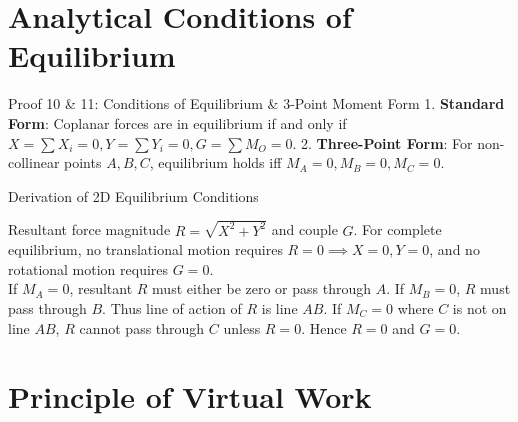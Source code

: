\documentclass[11pt, a4paper]{report}
\begin{document}
\section{Analytical Conditions of Equilibrium}

\begin{theorembox}{Proof 10 \& 11: Conditions of Equilibrium \& 3-Point Moment Form}
1. \textbf{Standard Form}: Coplanar forces are in equilibrium if and only if $X = \sum X_i = 0, Y = \sum Y_i = 0, G = \sum M_O = 0$.
2. \textbf{Three-Point Form}: For non-collinear points $A, B, C$, equilibrium holds iff $M_A = 0, M_B = 0, M_C = 0$.
\end{theorembox}

\begin{proofbox}{Derivation of 2D Equilibrium Conditions}
\begin{center}
\end{center}

Resultant force magnitude $R = \sqrt{X^2 + Y^2}$ and couple $G$. For complete equilibrium, no translational motion requires $R = 0 \implies X = 0, Y = 0$, and no rotational motion requires $G = 0$.\\
If $M_A = 0$, resultant $R$ must either be zero or pass through $A$. If $M_B = 0$, $R$ must pass through $B$. Thus line of action of $R$ is line $AB$. If $M_C = 0$ where $C$ is not on line $AB$, $R$ cannot pass through $C$ unless $R = 0$. Hence $R = 0$ and $G = 0$.
\end{proofbox}

\section{Principle of Virtual Work}
\end{document}
